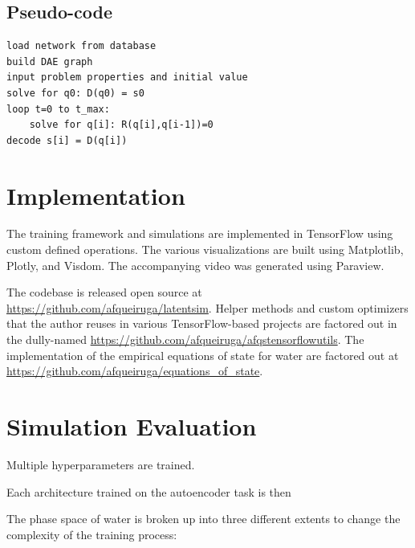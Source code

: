 \documentclass[]{article}
\begin{document}
\hypertarget{header-n3353}{%
\subsection{Pseudo-code}\label{header-n3353}}

\begin{verbatim}
load network from database
build DAE graph
input problem properties and initial value
solve for q0: D(q0) = s0
loop t=0 to t_max:
	solve for q[i]: R(q[i],q[i-1])=0
decode s[i] = D(q[i])
\end{verbatim}

\hypertarget{header-n3356}{%
\section{Implementation}\label{header-n3356}}

The training framework and simulations are implemented in TensorFlow 
using custom defined operations. The various visualizations are built
using Matplotlib, Plotly, and Visdom. The accompanying video was
generated using Paraview.

The codebase is released open source at
\url{https://github.com/afqueiruga/latentsim}. Helper methods and
custom optimizers that the
author reuses in various TensorFlow-based projects are factored out in
the dully-named \url{https://github.com/afqueiruga/afqstensorflowutils}.
The implementation of the empirical equations of state for water are
factored out at
\href{https://github.com/afqueiruga/equations_of_state}{https://github.com/afqueiruga/equations\_of\_state}.

\hypertarget{header-n3359}{%
\section{Simulation Evaluation}\label{header-n3359}}

Multiple hyperparameters are trained.

Each architecture trained on the autoencoder task is then

The phase space of water is broken up into three different extents to
change the complexity of the training process:
\end{document}
